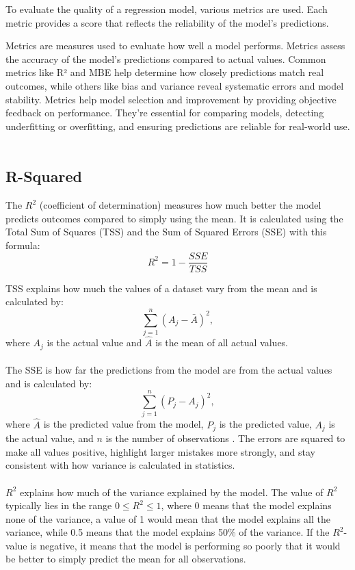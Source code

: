 To evaluate the quality of a regression model, various metrics are used. Each metric provides a score that reflects the reliability of the model's predictions.

Metrics are measures used to evaluate how well a model performs. Metrics assess the accuracy of the model’s predictions compared to actual values. Common metrics like R² and MBE help determine how closely predictions match real outcomes, while others like bias and variance reveal systematic errors and model stability. Metrics help model selection and improvement by providing objective feedback on performance. They’re essential for comparing models, detecting underfitting or overfitting, and ensuring predictions are reliable for real-world use.
\\\\

\subsection{R-Squared}
The $R^2$ (coefficient of determination) measures how much better the model predicts outcomes compared to simply using the mean. It is calculated using the Total Sum of Squares (TSS) and the Sum of Squared Errors (SSE) with this formula: 
$$R^2=1-\frac{SSE}{TSS}$$

TSS explains how much the values of a dataset vary from the mean and is calculated by: 
$$\sum_{j=1}^{n}(A_j - \bar{A})^2,$$
where $A_j$ is the actual value and $\hat{A}$ is the mean of all actual values.
\\\\

\noindent The SSE is how far the predictions from the model are from the actual values and is calculated by:
$$\sum_{j=1}^{n}(P_j - A_j)^2,$$
where $\hat{A}$ is the predicted value from the model, $P_{j}$ is the predicted value, $A_{j}$ is the actual value, and $n$ is the number of observations \cite{metrics}. The errors are squared to make all values positive, highlight larger mistakes more strongly, and stay consistent with how variance is calculated in statistics.
\\\\
$R^2$ explains how much of the variance explained by the model. The value of $R^2$ typically lies in the range $0 \leq R^2 \leq 1$, where 0 means that the model explains none of the variance, a value of 1 would mean that the model explains all the variance, while 0.5 means that the model explains 50\% of the variance. If the $R^2$-value is negative, it means that the model is performing so poorly that it would be better to simply predict the mean for all observations.

